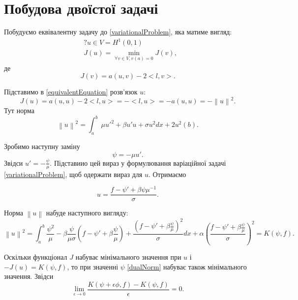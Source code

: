 \documentclass[a4paper]{article}
\newcommand\norm[1]{\left\lVert#1\right\rVert}
\numberwithin{equation}{section}
\begin{document}
\section{Побудова двоїстої задачі}
Побудуємо еквівалентну задачу до \ref{variationalProblem}, яка матиме вигляд:
\begin{equation}\label{equivalentProblem}
\begin{split}
& ? u \in V=H^1(0,1)
\\ & J(u) = \min_{ \forall v \in V, v(a)=0}J(v),
\end{split}
\end{equation}
де
\begin{equation}\label{equivalentEquation}
J(v) = a(u,v) - 2<l,v>.
\end{equation}

Підставимо в \ref{equivalentEquation} розв'язок $u$:
\begin{equation}
J(u) = a(u,u) - 2<l,u> = -<l,u> = -a(u,u) = -\norm{u}^2.
\end{equation}
Тут норма \begin{equation}
\norm{u} ^ 2 = \int_a^b\ \mu u'^2 + \beta u' u + \sigma u ^ 2dx + 2u^2(b).
\end{equation} 

Зробимо наступну заміну
\begin{equation}\label{replacement}
\psi = -\mu u'.
\end{equation}
Звідси $ u' = - \frac{ \psi } { \mu }$. Підставиио цей вираз у формулювання варіаційної задачі \ref{variationalProblem}, щоб одержати вираз для $ u $. Отримаємо

\begin{equation}
u = \frac {f - \psi' + \beta \psi \mu ^{-1} } {\sigma}.
\end{equation}

Норма $\norm{u}$ набуде наступного вигляду:
\begin{equation} \label{dualNorm}
\norm{u}^2 = \int_a^b \frac{\psi^2} {\mu} - \beta \frac {\psi} {\mu \sigma} (f - \psi' + \beta \frac {\psi} {\mu}) + \frac {(f - \psi' + \beta \frac {\psi} {\mu})^2} {\sigma} dx + \alpha (\frac {f - \psi' + \beta \frac {\psi} {\mu}} {\sigma})^2 = K(\psi, f).
\end{equation}

Оскільки функціонал $J$ набуває мінімального значення при $u$ і $-J(u) = K(\psi, f)$, то при значенні $\psi$ \ref{dualNorm} набуває також мінімального значення. Звідси 
\begin{equation} \label{dualNormLimit}
\lim_{\epsilon \to 0} \frac {K(\psi + \epsilon \phi, f) - K(\psi, f)} {\epsilon} = 0.
\end{equation}
\end{document}
